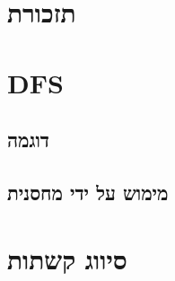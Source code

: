 \documentclass[]{article}
\def\insert#1{}
\begin{document}
\def\lecnum{2}
\def\topcis{
חיפוש לעומק -
\textenglish{Depth First Search (DFS)}
}

\section*{תזכורת}
\insert{reminder}
\section*{DFS}
\insert{dfs}
	\subsection*{דוגמה}
	\insert{example1}
	\subsection*{מימוש על ידי מחסנית}
	\insert{stack}
\section*{סיווג קשתות}
\insert{edges}
\end{document}
